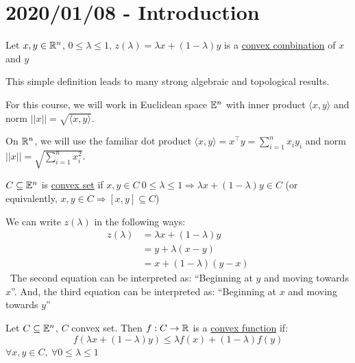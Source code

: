 \section{2020/01/08 - Introduction}

\begin{definition}
    Let $x, y \in \mathbb{R}^n$, $0 \leq \lambda \leq 1$, $z(\lambda) = \lambda x + (1 - \lambda)y$ is a \underline{convex combination} of $x$ and $y$
\end{definition}

This simple definition leads to many strong algebraic and topological results.

For this course, we will work in Euclidean space $\mathbb{E}^n$ with inner product $\langle x, y \rangle$ and norm $||x|| = \sqrt{\langle x, y \rangle}$.

On $\mathbb{R}^n$, we will use the familiar dot product $\langle x, y \rangle = x^\intercal y = \sum_{i = 1}^n x_iy_i$ and norm $||x|| = \sqrt{\sum_{i=1}^n x_i^2}$.

\begin{definition}
    $C \subseteq \mathbb{E}^n$ is \underline{convex set} if $x, y \in C \ 0 \leq \lambda \leq 1 \Rightarrow \lambda x + (1- \lambda)y \in C$ (or equivalently, $x, y \in C \Rightarrow [x,y] \subseteq C$)
\end{definition}

\begin{note} We can write $z(\lambda)$ in the following ways:
    \begin{align*}
        z(\lambda) &= \lambda x + (1 - \lambda) y \\
        &= y + \lambda (x - y) \\
        &= x + (1 - \lambda)(y - x)
    \end{align*}
\
    The second equation can be interpreted as: ``Beginning at $y$ and moving towards $x$''. And, the third equation can be interpreted as: ``Beginning at $x$ and moving towards $y$''
\end{note}

\begin{definition}
    Let $C \subseteq \mathbb{E}^n$, $C$ convex set. Then $f: C \rightarrow \mathbb{R}$ is a \underline{convex function} if:
    \begin{equation*}
        f(\lambda x + (1 - \lambda) y) \leq \lambda f(x) + (1 - \lambda)f(y)
    \end{equation*}
    $\forall x, y \in C, \ \forall 0 \leq \lambda \leq 1$
\end{definition}

